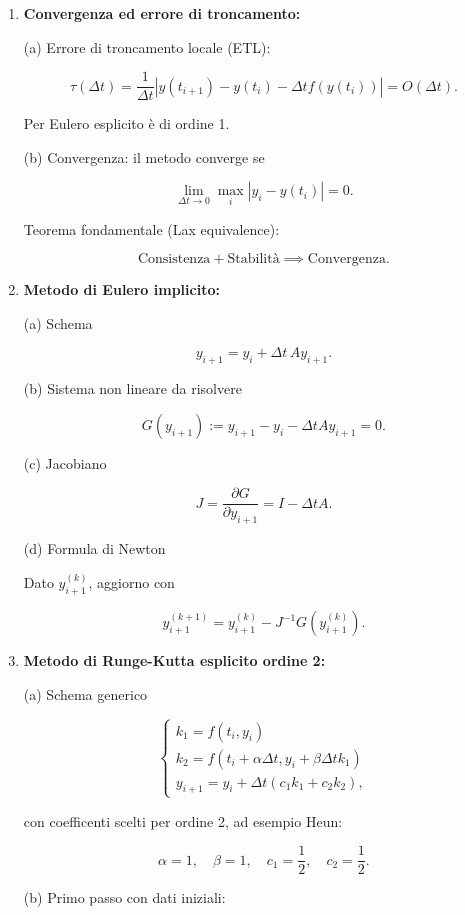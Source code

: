 \documentclass[12pt,a4paper]{article}
\begin{document}
\begin{enumerate}
\item \textbf{Convergenza ed errore di troncamento:}

(a) Errore di troncamento locale (ETL):

\[
\tau(\Delta t) = \frac{1}{\Delta t} \left| y(t_{i+1}) - y(t_i) - \Delta t f(y(t_i)) \right| = O(\Delta t).
\]

Per Eulero esplicito è di ordine 1.

(b) Convergenza: il metodo converge se

\[
\lim_{\Delta t \to 0} \max_i | y_i - y(t_i) | = 0.
\]

Teorema fondamentale (Lax equivalence): 

\[
\text{Consistenza} + \text{Stabilità} \implies \text{Convergenza}.
\]



\item \textbf{Metodo di Eulero implicito:}

(a) Schema

\[
y_{i+1} = y_i + \Delta t \, A y_{i+1}.
\]

(b) Sistema non lineare da risolvere

\[
G(y_{i+1}) := y_{i+1} - y_i - \Delta t A y_{i+1} = 0.
\]

(c) Jacobiano

\[
J = \frac{\partial G}{\partial y_{i+1}} = I - \Delta t A.
\]

(d) Formula di Newton

Dato \( y_{i+1}^{(k)} \), aggiorno con

\[
y_{i+1}^{(k+1)} = y_{i+1}^{(k)} - J^{-1} G(y_{i+1}^{(k)}).
\]



\item \textbf{Metodo di Runge-Kutta esplicito ordine 2:}

(a) Schema generico

\[
\begin{cases}
k_1 = f(t_i, y_i) \\
k_2 = f(t_i + \alpha \Delta t, y_i + \beta \Delta t k_1) \\
y_{i+1} = y_i + \Delta t (c_1 k_1 + c_2 k_2),
\end{cases}
\]

con coefficenti scelti per ordine 2, ad esempio Heun:

\[
\alpha = 1, \quad \beta = 1, \quad c_1 = \frac{1}{2}, \quad c_2 = \frac{1}{2}.
\]

(b) Primo passo con dati iniziali:


\end{enumerate}
\end{document}
